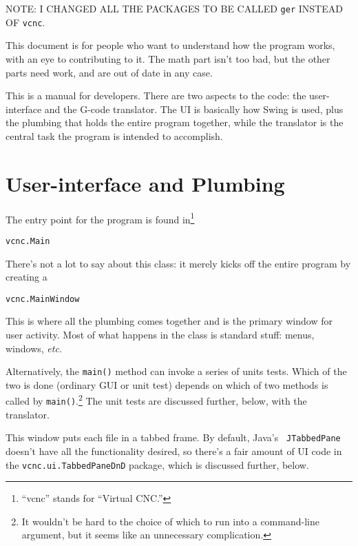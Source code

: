 \documentclass[titlepage,oneside,10pt]{article}
\begin{document}
\raggedbottom

\newcommand{\mymargin}[1]{\marginpar{\rm\tiny #1}}
\newcommand{\leftmar}[1]{\reversemarginpar \mymargin{#1}}

NOTE: I CHANGED ALL THE PACKAGES TO BE CALLED {\tt ger} INSTEAD OF {\tt vcnc}.

This document is for people who want to understand how the program
works, with an eye to contributing to it. The math part isn't too bad,
but the other parts need work, and are out of date in any case.


This is a manual for developers.
There are two aspects to the code: the user-interface and the G-code
translator. The UI is basically how Swing is used, plus the plumbing
that holds the entire program together, while the translator
is the central task the program is intended to accomplish.

\section{User-interface and Plumbing}

The entry point for the program is found in\footnote{``vcnc'' stands
for ``Virtual CNC.''}
\begin{verbatim}
vcnc.Main
\end{verbatim}
There's not a lot to say about this class: it merely kicks off the entire
program by creating a 
\begin{verbatim}
vcnc.MainWindow
\end{verbatim}
This is where all the plumbing comes together and is the primary
window for user activity. Most of what happens in the class is
standard stuff: menus, windows, \emph{etc}.

Alternatively, the {\tt main()} method can invoke a series of units
tests. Which of the two is done (ordinary GUI or unit test) depends on
which of two methods is called by {\tt main()}.\footnote{It wouldn't
be hard to the choice of which to run into a command-line argument,
but it seems like an unnecessary complication.} The unit tests are
discussed further, below, with the translator.

This window puts each file in a tabbed frame. By default, Java's {\tt
  JTabbedPane} doesn't have all the functionality desired, so there's
a fair amount of UI code in the {\tt vcnc.ui.TabbedPaneDnD} package, which is
discussed further, below.
\end{document}
